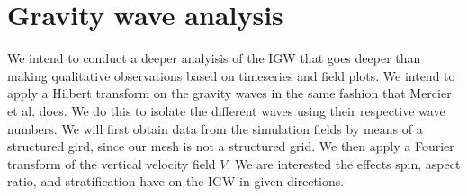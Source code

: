\section{Gravity wave analysis}
\label{section:IGW_analysis}
We intend to conduct a deeper analyisis of the IGW that goes deeper than making qualitative observations based on timeseries and field plots. We intend to apply a Hilbert transform on the gravity waves in the same fashion that Mercier et al. \cite{mercier_reflection_2008} does. We do this to isolate the different waves using their respective wave numbers. We will first obtain data from the simulation fields by means of a structured gird, since our mesh is not a structured grid. We then apply a Fourier transform of the vertical velocity field $V$. We are interested the effects spin, aspect ratio, and stratification have on the IGW in given directions. 